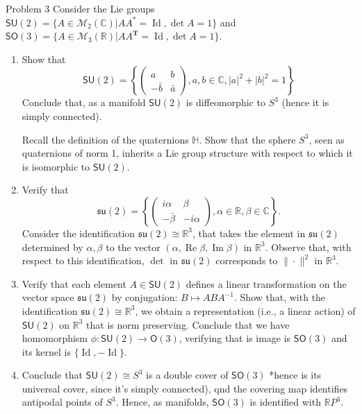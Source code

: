 \begin{idea1}{Problem 3}\leavevmode
	Consider the Lie groups $\mathsf{SU}(2) =\{A\in\mathcal{M}_{2}(\mathbb{C})|AA^*=\operatorname{Id}, \det A=1\}$ and $\mathsf{SO}(3) =\{A\in\mathcal{M}_{3}(\mathbb{R})|AA^{\mathbf{T}}=\operatorname{Id},\det A=1\}$.
	\begin{enumerate}[label=\alph*.]
		\item Show that
		\[\mathsf{SU}(2) =\left\{ \begin{pmatrix} a&b\\-\bar{b}&\bar{a} \end{pmatrix} ,a,b\in\mathbb{C},|a|^2+|b|^2=1\right\} \]
		Conclude that, as a manifold $\mathsf{SU}(2)$ is diffeomorphic to $S^3$ (hence it is simply connected).

		Recall the definition of the quaternions $\mathbb{H}$. Show that the sphere $S^3$, seen as quaternions of norm 1, inherits a Lie group structure with respect to which it is isomorphic to $\mathsf{SU}(2)$.

	\item Verify that
		\begin{equation}\label{eq:1}
			\mathfrak{su}(2) =\left\{ \begin{pmatrix} i\alpha &\beta\\-\bar{\beta} &-i\alpha \end{pmatrix} ,\alpha\in\mathbb{R},\beta\in\mathbb{C} \right\} .
		\end{equation}
		Consider the identification $\mathfrak{su}(2) \cong \mathbb{R}^{3}$, that takes the element in $\mathfrak{su}(2)$ determined by $\alpha,\beta$ to the vector $(\alpha,\operatorname{Re}\beta,\operatorname{Im}\beta)$ in $\mathbb{R}^{3}$. Observe that, with respect to this identification, $ \det $ in $\mathfrak{su}(2)$ corresponds to $\|\cdot\|^2$ in $\mathbb{R}^{3}$.


	\item Verify that each element $A\in\mathsf{SU}(2)$ defines a linear transformation on the vector space $\mathfrak{su}(2)$ by conjugation: $B\mapsto ABA^{-1}$. Show that, with the identification $\mathfrak{su}(2) \cong \mathbb{R}^{3}$, we obtain a representation (i.e., a linear action) of $\mathsf{SU}(2)$ on $\mathbb{R}^{3}$ that is norm preserving. Conclude that we have homomorphism $\phi:\mathsf{SU}(2) \to \mathsf{O}(3)$, verifying that is image is $\mathsf{SO}(3)$ and its kernel is $\{\operatorname{Id},-\operatorname{Id}\}$.

	\item Conclude that $\mathsf{SU}(2) \cong S^3$ is a double cover of $\mathsf{SO}(3)$ *hence is its universal cover, since it's simply connected), qnd the covering map identifies antipodal points of $S^3$. Hence, as manifolds, $\mathsf{SO}(3)$ is identified with $\mathbb{R}P^{3}$.
	\end{enumerate}
\end{idea1}

